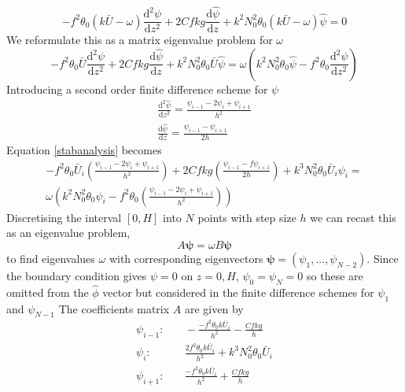 \begin{equation*}
-f^2\theta_0(k\bar{U}-\omega)\frac{\text{d}^2{\psi}}{\text{d}z^2}+2Cfkg\frac{\text{d}\hat{\psi}}{\text{d}z}+k^2 N_0^2\theta_0(k\bar{U}-\omega)\hat{\psi}=0
\end{equation*}
We reformulate this as a matrix eigenvalue problem for $\omega$
\begin{equation}
-f^2\theta_0\bar{U}\frac{\text{d}^2{\psi}}{\text{d}z^2}+2Cfkg\frac{\text{d}\hat{\psi}}{\text{d}z}+k^2 N_0^2\theta_0\bar{U}\hat{\psi}=\omega \left(k^2N_0^2\theta_0\hat{\psi}-f^2\theta_0 \frac{\text{d}^2{\psi}}{\text{d}z^2}\right)
\label{stabanalysis}
\end{equation}
Introducing a second order finite difference scheme for $\psi$
\begin{equation*}
\begin{aligned}
\frac{\text{d}^2{\hat{\psi}}}{\text{d}z^2} = \frac{\psi_{i-1} - 2\psi_i + \psi_{i+1}}{h^2}\\
\frac{\text{d}\hat{\psi}}{\text{d}z} = \frac{\psi_{i-1} - \psi_{i+1}}{2h}
\end{aligned}
\end{equation*}
Equation \ref{stabanalysis} becomes
\begin{equation}
\begin{aligned}
-f^2\theta_0\bar{U}_i\left(\frac{\psi_{i-1} - 2\psi_i + \psi_{i+1}}{h^2}\right)+2Cfkg\left(\frac{\psi_{i-1} -f \psi_{i+1}}{2h}\right)+k^3 N_0^2\theta_0\bar{U}_i\psi_i= \\
\omega\left(k^2N_0^2\theta_0\psi_i-f^2\theta_0\left(\frac{\psi_{i-1} - 2\psi_i + \psi_{i+1}}{h^2}\right)\right)
\end{aligned}
\end{equation}
Discretising the interval $[0,H]$ into $N$ points with step size $h$ we can recast this as an eigenvalue problem,
\begin{equation*}
A\bm{\psi} = \omega B\bm{\psi}
\end{equation*}
to find eigenvalues $\omega$ with corresponding eigenvectors $\bm{\psi} = \left(\psi_1, ... , \psi_{N-2}\right)$. Since the boundary condition gives $\psi = 0$ on $z = 0, H$, $\psi_0 = \psi_N = 0$ so these are omitted from the $\hat{\phi}$ vector but considered in the finite difference schemes for $\psi_1$ and $\psi_{N-1}$
The coefficients matrix $A$ are given by
\begin{equation}
\begin{aligned}
\psi_{i-1}:& \quad -\frac{-f^2\theta_0k\bar{U}_i}{h^2} - \frac{Cfkg}{h}\\
\psi_i:& \quad \frac{2f^2\theta_0k\bar{U}_i}{h^2} + k^3N_0^2\theta_0\bar{U}_i\\
\psi_{i+1}:& \quad \frac{-f^2\theta_0k\bar{U}_i}{h^2} + \frac{Cfkg}{h}\\
\end{aligned}
\end{equation}
